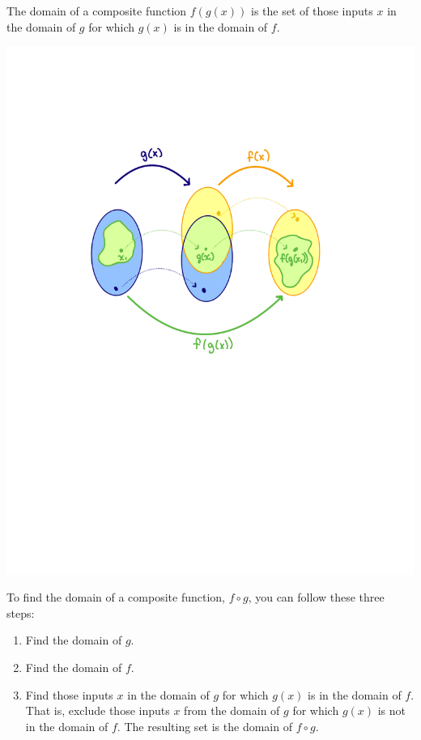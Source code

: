 \documentclass{ximera}
\begin{document}
\begin{callout}
The domain of a composite function $f(g(x))$ is the set of those inputs $x$ in the domain of $g$ for which $g(x)$ is in the domain of $f$. 
\end{callout}

\begin{image}
\includegraphics{CompDom1.pdf}
\end{image}



To find the domain of a composite function, $f\circ g$, you can follow these three steps:
\begin{enumerate}[label=\arabic*)]
\item Find the domain of $g$.
\item Find the domain of $f$.
\item Find those inputs $x$ in the domain of $g$ for which $g(x)$ is in the domain of $f$.  That is, exclude those inputs $x$ from the domain of $g$ for which $g(x)$ is not in the domain of $f$.  The resulting set is the domain of $f \circ g$.  
\end{enumerate} 
\end{document}
